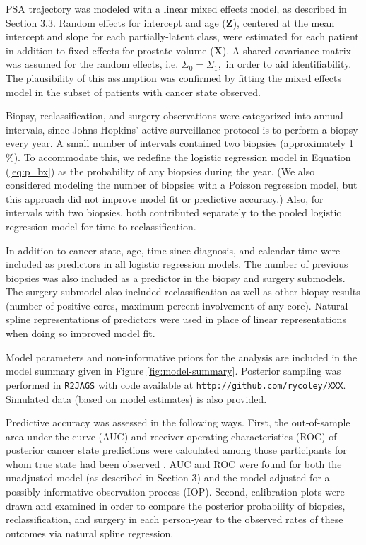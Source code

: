 \documentclass[12pt, letterpaper]{article}
\newcommand{\bmZ}{\mathbf{Z}}
\newcommand{\bmX}{\mathbf{X}}
\begin{document}
PSA trajectory was modeled with a linear mixed effects model, as described in Section 3.3. Random effects for intercept and age ($\bmZ$), centered at the mean intercept and slope for each partially-latent class, were estimated for each patient in addition to fixed effects for prostate volume ($\bmX$). A shared covariance matrix was assumed for the random effects, i.e. $\Sigma_0=\Sigma_1,$ in order to aid identifiability. The plausibility of this assumption was confirmed by fitting the mixed effects model in the subset of patients with cancer state observed. 

Biopsy, reclassification, and surgery observations were categorized into annual intervals, since Johns Hopkins' active surveillance protocol is to perform a biopsy every year. A small number of intervals contained two biopsies (approximately 1$\%$). To accommodate this, we redefine the logistic regression model in Equation (\ref{eq:p_bx}) as the probability of any biopsies during the year. (We also considered modeling the number of biopsies with a Poisson regression model, but this approach did not improve model fit or predictive accuracy.) Also, for intervals with two biopsies, both contributed separately to the pooled logistic regression model for time-to-reclassification. 

In addition to cancer state, age, time since diagnosis, and calendar time were included as predictors in all logistic regression models. The number of previous biopsies was also included as a predictor in the biopsy and surgery submodels. The surgery submodel also included reclassification as well as other biopsy results (number of positive cores, maximum percent involvement of any core). Natural spline representations of predictors were used in place of linear representations when doing so improved model fit.

Model parameters and non-informative priors for the analysis are included in the model summary given in Figure \ref{fig:model-summary}. Posterior sampling was performed in \texttt{R2JAGS} with code available at \texttt{http://github.com/rycoley/XXX}. Simulated data (based on model estimates) is also provided.

Predictive accuracy was assessed in the following ways. First, the out-of-sample area-under-the-curve (AUC) and receiver operating characteristics (ROC) of posterior cancer state predictions were calculated among those participants for whom true state had been observed \cite{Hosmer2013}. AUC and ROC were found for both the unadjusted model (as described in Section 3) and the model adjusted for a possibly informative observation process (IOP). Second, calibration plots were drawn and examined in order to compare the posterior probability of biopsies, reclassification, and surgery in each person-year to the observed rates of these outcomes via natural spline regression.
\end{document}
